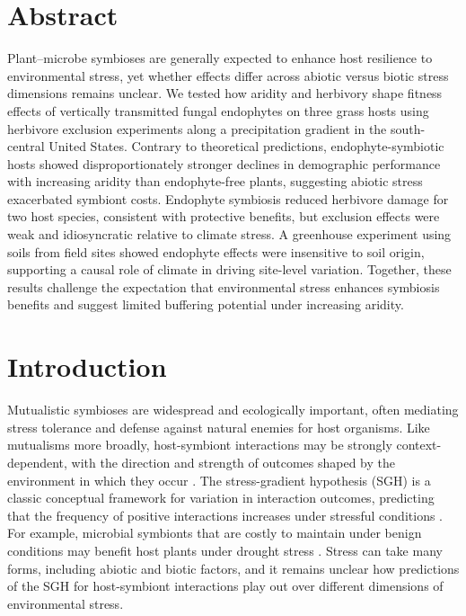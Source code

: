 \documentclass[12pt]{article}\usepackage[]{graphicx}\usepackage[dvipsnames]{xcolor}
\begin{document}
\newpage
\linenumbers
\section*{Abstract}
Plant–microbe symbioses are generally expected to enhance host resilience to environmental stress, yet whether effects differ across abiotic versus biotic stress dimensions remains unclear. 
We tested how aridity and herbivory shape fitness effects of vertically transmitted fungal endophytes on three grass hosts using herbivore exclusion experiments along a precipitation gradient in the south-central United States.
Contrary to theoretical predictions, endophyte-symbiotic hosts showed disproportionately stronger declines in demographic performance with increasing aridity than endophyte-free plants, suggesting abiotic stress exacerbated symbiont costs. 
Endophyte symbiosis reduced herbivore damage for two host species, consistent with protective benefits, but exclusion effects were weak and idiosyncratic relative to climate stress. 
A greenhouse experiment using soils from field sites showed endophyte effects were insensitive to soil origin, supporting a causal role of climate in driving site-level variation. Together, these results challenge the expectation that environmental stress enhances symbiosis benefits and suggest limited buffering potential under increasing aridity.
\newpage
\section*{Introduction}
Mutualistic symbioses are widespread and ecologically important, often mediating stress tolerance and defense against natural enemies for host organisms. 
Like mutualisms more broadly, host-symbiont interactions may be strongly context-dependent, with the direction and strength of outcomes shaped by the environment in which they occur \citep{hoeksema2015context, bronstein1994conditional,hoang2024impacts,rudgers2020climate}. 
The stress-gradient hypothesis (SGH) is a classic conceptual framework for variation in interaction outcomes, predicting that the frequency of positive interactions increases under stressful conditions \citep{louthan2015and,bertness1994positive,holmgren2010strong,maestre2009refining}.
For example, microbial symbionts that are costly to maintain under benign conditions may benefit host plants under drought stress  \citep{giauque2019endophyte}. 
Stress can take many forms, including abiotic and biotic factors, and it remains unclear how predictions of the SGH for host-symbiont interactions play out over different dimensions of environmental stress. 
\end{document}
